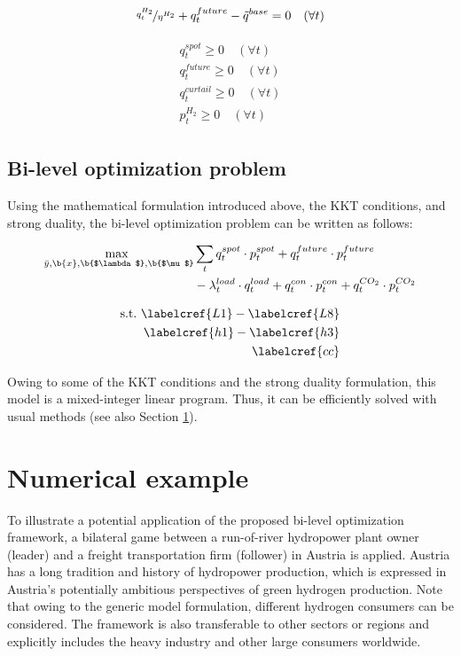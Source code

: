 \documentclass[review]{elsarticle}
\begin{document}
\begin{align}\label{L7}
\nicefrac{q_{t}^{H_2}}{\eta^{H_2}} + q_{t}^{future} - \tilde{q}^{base} = 0 \quad (\forall t)
\end{align}

\begin{align}\label{L8}
\begin{aligned}
q_{t}^{spot} \geq 0 \quad (\forall t)\\
q_{t}^{future} \geq 0 \quad (\forall t)\\
q_{t}^{curtail} \geq 0 \quad (\forall t)\\
p_{t}^{H_2} \geq 0 \quad (\forall t)
\end{aligned}
\end{align}

\subsection{Bi-level optimization problem}\label{sec:bi_level}
Using the mathematical formulation introduced above, the KKT conditions, and strong duality, the bi-level optimization problem can be written as follows:

\begin{align}\label{bi_1}
\begin{split}
\underset{\bar{y}, \b{x}, \b{$\lambda$}, \b{$\mu$}}{\mathrm{max~}}&\sum_{t} q_{t}^{spot}\cdot p_{t}^{spot}+q_{t}^{future}\cdot p_{t}^{future}\\
& - \lambda_{t}^{load} \cdot q_{t}^{load} + q_{t}^{con}\cdot p_{t}^{con}+q_{t}^{CO_2}\cdot p_{t}^{CO_2}\\
\end{split}
\end{align}

\begin{align}\label{bi_2}
\begin{aligned}
\mathrm{s.t.~} \labelcref{L1}-\labelcref{L8}\\
\labelcref{h1}-\labelcref{h3}\\ 
\labelcref{cc}
\end{aligned}
\end{align}

Owing to some of the KKT conditions and the strong duality formulation, this model is a mixed-integer linear program. Thus, it can be efficiently solved with usual methods (see also Section \ref{numerical}).

\section{Numerical example}\label{numerical}
To illustrate a potential application of the proposed bi-level optimization framework, a bilateral game between a run-of-river hydropower plant owner (leader) and a freight transportation firm (follower) in Austria is applied. Austria has a long tradition and history of hydropower production, which is expressed in Austria's potentially ambitious perspectives of green hydrogen production. Note that owing to the generic model formulation, different hydrogen consumers can be considered. The framework is also transferable to other sectors or regions and explicitly includes the heavy industry and other large consumers worldwide. 
\end{document}
